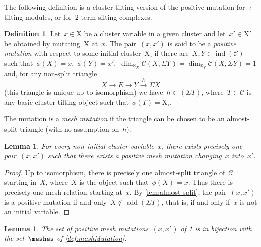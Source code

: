 \documentclass{amsart}
\newtheorem{lemma}[theorem]{Lemma}
\theoremstyle{definition}
\newtheorem{definition}[theorem]{Definition}
\newcommand{\darkblue}{\color{darkblue}} %
\newcommand{\defn}[1]{\textsl{\darkblue #1}} %
\newcommand{\cluster}{\mathrm{X}} %
\newcommand{\field}{\mathbb{K}}
\newcommand{\cat}{\mathcal{C}}
\newcommand{\susp}{\Sigma}
\newcommand{\add}{\operatorname{add}}
\newcommand{\ind}{\operatorname{ind}}
\newcommand{\CC}{\phi}
\begin{document}
The following definition is a cluster-tilting version of the positive mutation for~$\tau$-tilting modules, or for~$2$-term silting complexes.

\begin{definition}
\label{def:positive mutation}
Let~$x\in\cluster$ be a cluster variable in a given cluster and let~$x' \in \cluster'$ be obtained by mutating~$\cluster$ at~$x$.
The pair~$(x,x')$ is said to be a \defn{positive mutation} with respect to some initial cluster~$\cluster_\circ$ if there are~$X,Y\in \ind(\cat)$ such that~$\CC(X)=x$,~$\CC(Y)=x'$,~$\dim_{\field_X}\cat(X, \susp Y) = \dim_{\field_Y}\cat(X, \susp Y) = 1$ and, for any non-split triangle
\[
X\xrightarrow{} E \xrightarrow{} Y \xrightarrow{h} \susp X 
\]
(this triangle is unique up to isomorphism) we have~$h\in (\susp T)$, where~$T\in\cat$ is any basic cluster-tilting object such that~$\CC(T)=\cluster_\circ$.

The mutation is a \defn{mesh mutation} if the triangle can be chosen to be an almost-split triangle (with no assumption on~$h$).
\end{definition}


\begin{lemma}
\label{lem:exaclty one mesh mutation}
For every non-initial cluster variable~$x$, there exists precisely one pair~$(x,x')$ such that there exists a positive mesh mutation changing~$x$ into~$x'$.
\end{lemma}

\begin{proof}
Up to isomorphism, there is precisely one almost-split triangle of~$\cat$ starting in~$X$, where~$X$ is the object such that~$\phi(X) = x$.  Thus there is precisely one mesh relation starting at~$x$. By \cref{lem:almost-split}, the pair~$(x,x')$ is a positive mutation if and only~$X\notin \add(\susp T)$, that is, if and only if~$x$ is not an initial variable.
\end{proof}

\begin{lemma}
\label{lem:mesh mutations and meshes}
The set of positive mesh mutations~$(x,x')$ of \cref{def:positive mutation} is in bijection with the set~$\meshes$ of \cref{def:meshMutation}.
\end{lemma}
\end{document}
